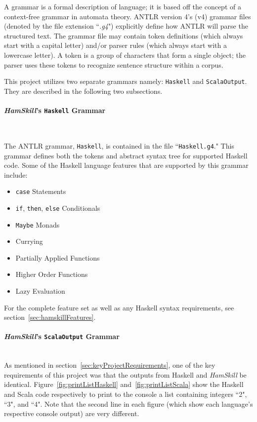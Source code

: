 \documentclass{report}
\newcommand{\myparagraph}[1]{\paragraph{#1}\mbox{}\\}
\begin{document}
A grammar is a formal description of language; it is based off the concept of a context-free grammar in automata theory.  ANTLR version 4's (v4) grammar files (denoted by the file extension ``\emph{.g4}") explicitly define how ANTLR will parse the structured text.  The grammar file may contain token definitions (which always start with a capital letter) and/or parser rules (which always start with a lowercase letter).  A token is a group of characters that form a single object; the parser uses these tokens to recognize sentence structure within a corpus.

This project utilizes two separate grammars namely: \texttt{Haskell} and \texttt{ScalaOutput}.  They are described in the following two subsections.

\myparagraph{\textit{HamSkill}'s \texttt{Haskell} Grammar}\label{sec:haskellG4}

The ANTLR grammar, \texttt{Haskell}, is contained in the file ``\texttt{Haskell.g4}."  This grammar defines both the tokens and abstract syntax tree for supported Haskell code.  Some of the Haskell language features that are supported by this grammar include:

\begin{itemize}
   \item \texttt{case} Statements
   \item \texttt{if}, \texttt{then}, \texttt{else} Conditionals
   \item \texttt{Maybe} Monads
   \item Currying
   \item Partially Applied Functions
   \item Higher Order Functions
   \item Lazy Evaluation
\end{itemize}

For the complete feature set as well as any Haskell syntax requirements, see section~\ref{sec:hamskillFeatures}.

\myparagraph{\textit{HamSkill}'s \texttt{ScalaOutput} Grammar} 

As mentioned in section~\ref{sec:keyProjectRequirements}, one of the key requirements of this project was that the outputs from Haskell and \textit{HamSkill} be identical.  Figure~\ref{fig:printListHaskell} and~\ref{fig:printListScala} show the Haskell and Scala code respectively to print to the console a list containing integers ``2", ``3", and ``4".  Note that the second line in each figure (which show each language's respective console output) are very different.
\end{document}
